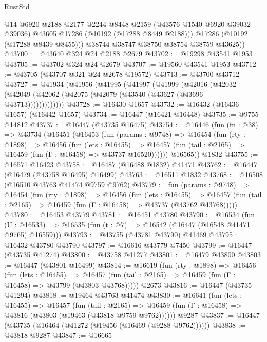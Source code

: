 \begin{lexlean}{RustStd}
\begin{coremodule}
            @14
            @6920
            @2188
            @2177
            @2244
            @8448
            @2159
            (@43576 @1540 @6920 @39032 @39036)
            @43605
            @17286
            (@10192 (@17288 @8449 @2188)))
          @17286
          (@10192 (@17288 @8439 @8455)))
        @38744
        @38747
        @38750
        @38754
        @38759
        @43625))
@43700 := @43640 @324 @24 @2188 @2679
@43702 := @19298 @43541 @1953
@43705 := @43702 @324 @24 @2679
@43707 := @19560 @43541 @1953
@43712 := @43705 (@43707 @321 @24 @2678 @19572)
@43713 := @43700 @43712
@43727 := @41934
    (@41956
      (@41995
        (@41997
          (@41999
            (@42016
              (@42032 (@42049 (@42062 (@42075 (@42079 (@43540 (@43627 (@43696 @43713)))))))))))))
@43728 := @16430 @1657
@43732 := @16432 (@16436 @1657) (@16442 @1657)
@43734 := @16447 (@16421 @16448)
@43735 := @9755 @14812
@43737 := @16447 (@43735 @16475)
@43754 := @16446
    (fun (fn : @38) =>
    @43734
      (@16451
        (@16453
          (fun (params : @9748) =>
          @16454
            (fun (rty : @1898) =>
            @16456
              (fun (lets : @16455) =>
              @16457 (fun (tail : @2165) => @16459 (fun (Γ : @16458) => @43737 @16520))))))
        @16565))
    @1832
@43755 := @16571 @16423
@43758 := @16487 (@16488 @1832) @41471
@43762 := @16447 (@16479 (@43758 @16495) @16499)
@43763 := @16511 @1832
@43768 := @16508 (@16510 @43763 @41474 @9759 @9762)
@43779 := fun (params : @9748) =>
  @16454
    (fun (rty : @1898) =>
    @16456
      (fun (lets : @16455) =>
      @16457 (fun (tail : @2165) => @16459 (fun (Γ : @16458) => @43737 (@43762 @43768)))))
@43780 := @16453 @43779
@43781 := @16451 @43780
@43790 := @16534
    (fun (U : @16533) => @16535 (fun (t : @7) => @16542 (@16447 (@16548 @41471 @9765) @16559)))
@43793 := @43755 (@43781 @43790) @41469
@43795 := @16432 @43780 @43790
@43797 := @16616 @43779 @7450
@43799 := @16447 (@43735 @41274)
@43800 := @43758 @41277
@43801 := @16479 @43800
@43803 := @16447 (@43801 @16499)
@43814 := @16619
    (fun (rty : @1898) =>
    @16456
      (fun (lets : @16455) =>
      @16457 (fun (tail : @2165) => @16459 (fun (Γ : @16458) => @43799 (@43803 @43768)))))
    @2673
@43816 := @16447 (@43735 @41294)
@43818 := @19464 @43763 @41474
@43830 := @16641
    (fun (lets : @16455) =>
    @16457
      (fun (tail : @2165) =>
      @16459 (fun (Γ : @16458) => @43816 (@43803 (@19463 (@43818 @9759 @9762))))))
    @9287
@43837 := @16447 (@43735 (@16464 (@41272 (@19456 (@16469 (@9288 @9762))))))
@43838 := @43818 @9287
@43847 := @16665

\end{coremodule}
\end{lexlean}
